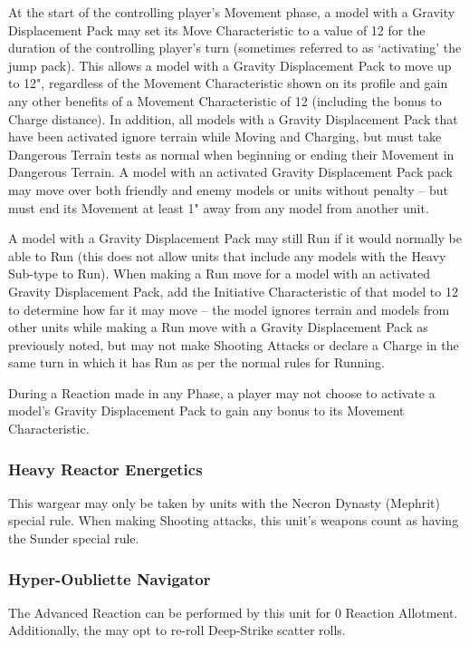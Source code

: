 At the start of the controlling player’s Movement phase, a model with a Gravity Displacement Pack may set its Move Characteristic to a value of 12 for the duration of the controlling player’s turn (sometimes referred to as ‘activating’ the jump pack). This allows a model with a Gravity Displacement Pack to move up to 12", regardless of the Movement Characteristic shown on its profile and gain any other benefits of a Movement Characteristic of 12 (including the bonus to Charge distance). In addition, all models with a Gravity Displacement Pack that have been activated ignore terrain while Moving and Charging, but must take Dangerous Terrain tests as normal when beginning or ending their Movement in Dangerous Terrain. A model with an activated Gravity Displacement Pack pack may move over both friendly and enemy models or units without penalty – but must end its Movement at least 1" away from any model from another unit.

A model with a Gravity Displacement Pack may still Run if it would normally be able to Run (this does not allow units that include any models with the Heavy Sub-type to Run). When making a Run move for a model with an activated Gravity Displacement Pack, add the Initiative Characteristic of that model to 12 to determine how far it may move – the model ignores terrain and models from other units while making a Run move with a Gravity Displacement Pack as previously noted, but may not make Shooting Attacks or declare a Charge in the same turn in which it has Run as per the normal rules for Running.

During a Reaction made in any Phase, a player may not choose to activate a model’s Gravity Displacement Pack to gain any bonus to its Movement Characteristic.

\subsubsection{Heavy Reactor Energetics} \label{Heavy Reactor Energetics}

This wargear may only be taken by units with the Necron Dynasty (Mephrit) special rule. When making Shooting attacks, this unit's weapons count as having the Sunder special rule.

\subsubsection{Hyper-Oubliette Navigator} \label{Hyper-Oubliette Navigator}

The  Advanced Reaction can be performed by this unit for 0 Reaction Allotment. Additionally, the may opt to re-roll Deep-Strike scatter rolls.


